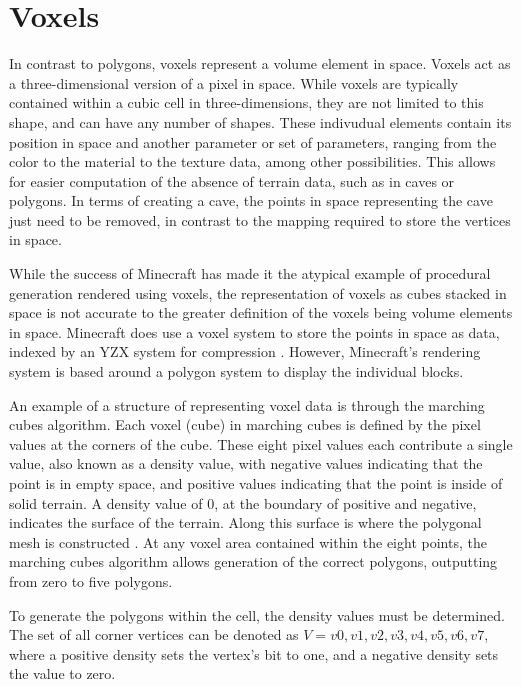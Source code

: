\documentclass[10pt]{report}
\begin{document}
		\section{Voxels}
	
		In contrast to polygons, voxels represent a volume element in space. Voxels act as a three-dimensional version of a pixel in space. While voxels are typically contained within a cubic cell in three-dimensions, they are not limited to this shape, and can have any number of shapes. These indivudual elements contain its position in space and another parameter or set of parameters, ranging from the color to the material to the texture data, among other possibilities. This allows for easier computation of the absence of terrain data, such as in caves or polygons. In terms of creating a cave, the points in space representing the cave just need to be removed, in contrast to the mapping required to store the vertices in space. 
		
		While the success of Minecraft has made it the atypical example of procedural generation rendered using voxels, the representation of voxels as cubes stacked in space is not accurate to the greater definition of the voxels being volume elements in space. Minecraft does use a voxel system to store the points in space as data, indexed by an YZX system for compression \cite{minecraft-voxel}. However, Minecraft's rendering system is based around a polygon system to display the individual blocks. 
		
		An example of a structure of representing voxel data is through the marching cubes algorithm. Each voxel (cube) in marching cubes is defined by the pixel values at the corners of the cube. These eight pixel values each contribute a single value, also known as a density value, with negative values indicating that the point is in empty space, and positive values indicating that the point is inside of solid terrain. A density value of 0, at the boundary of positive and negative, indicates the surface of the terrain. Along this surface is where the polygonal mesh is constructed \cite{marching-cubes}. At any voxel area contained within the eight points, the marching cubes algorithm allows generation of the correct polygons, outputting from zero to five polygons.
		
		To generate the polygons within the cell, the density values must be determined. The set of all corner vertices can be denoted as \(V = {v0,v1,v2,v3,v4,v5,v6,v7}\), where a positive density sets the vertex's bit to one, and a negative density sets the value to zero. 
\end{document}
